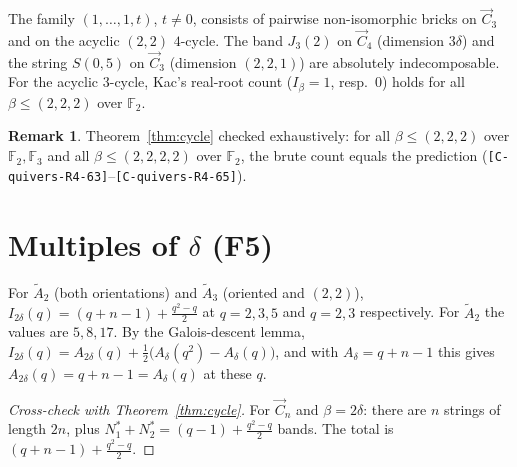 \documentclass[11pt]{article}
\theoremstyle{definition}\newtheorem{definition}[theorem]{Definition}\newtheorem{remark}[theorem]{Remark}\newtheorem{observation}[theorem]{Numerical observation}
\newcommand{\C}[1]{\texttt{[C-#1]}}
\begin{document}
\begin{proposition}[Verified \C{quivers-R4-59}--\C{quivers-R4-62}, \C{quivers-R4-66}]
The family $(1,\dots,1,t)$, $t\neq0$, consists of pairwise non-isomorphic bricks on $\vec C_3$ and on the acyclic $(2,2)$ $4$-cycle.
The band $J_3(2)$ on $\vec C_4$ (dimension $3\delta$) and the string $S(0,5)$ on $\vec C_3$ (dimension $(2,2,1)$) are absolutely indecomposable.
For the acyclic $3$-cycle, Kac's real-root count ($I_\beta=1$, resp.\ $0$) holds for all $\beta\le(2,2,2)$ over $\mathbb F_2$.
\end{proposition}
\begin{remark}
Theorem~\ref{thm:cycle} checked exhaustively: for all $\beta\le(2,2,2)$ over $\mathbb F_2,\mathbb F_3$ and all $\beta\le(2,2,2,2)$ over $\mathbb F_2$,
the brute count equals the prediction (\C{quivers-R4-63}--\C{quivers-R4-65}).
\end{remark}

\section{Multiples of $\delta$ (F5)}
\begin{proposition}[Verified \C{quivers-R5-67}--\C{quivers-R5-76}]
For $\widetilde A_2$ (both orientations) and $\widetilde A_3$ (oriented and $(2,2)$), $I_{2\delta}(q)=(q+n-1)+\tfrac{q^2-q}2$ at $q=2,3,5$ and $q=2,3$ respectively.
For $\widetilde A_2$ the values are $5,8,17$. By the Galois-descent lemma,
$I_{2\delta}(q)=A_{2\delta}(q)+\tfrac12\big(A_\delta(q^2)-A_\delta(q)\big)$, and with $A_\delta=q+n-1$ this gives $A_{2\delta}(q)=q+n-1=A_\delta(q)$ at these $q$.
\end{proposition}
\begin{proof}[Cross-check with Theorem~\ref{thm:cycle}]
For $\vec C_n$ and $\beta=2\delta$: there are $n$ strings of length $2n$, plus $N^*_1+N^*_2=(q-1)+\frac{q^2-q}2$ bands. The total is $(q+n-1)+\frac{q^2-q}2$.
\end{proof}
\end{document}

